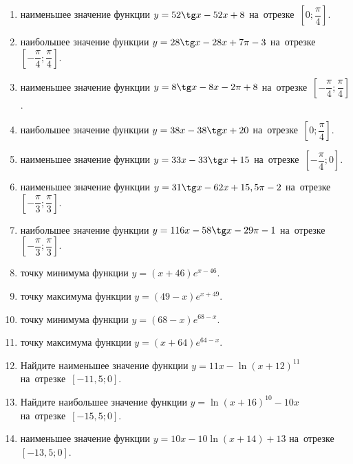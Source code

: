 \documentclass[a4paper,10pt]{article}
\begin{document}
\begin{enumerate}
\item {} наименьшее значение функции $y = 52\tg x-52x+8$ на~отрезке~$\left[0;\dfrac{\pi }{4}\right]$.

\item {} наибольшее значение функции $y=28\tg x-28x+7\pi -3$ на~отрезке~$\left[-\dfrac{\pi }{4};\dfrac{\pi }{4}\right]$.

\item {} наименьшее значение функции $y=8\tg x-8x-2\pi +8$ на~отрезке~$\left[-\dfrac{\pi }{4};\dfrac{\pi }{4}\right]$.

\item {} наибольшее значение функции $y = 38x-38\tg x +20$ на~отрезке~$\left[0;\dfrac{\pi }{4}\right]$.

\item {} наименьшее значение функции $y = 33x-33\tg x +15$ на~отрезке~$\left[-\dfrac{\pi }{4};0\right]$.

\item {} наименьшее значение функции $y = 31\tg x-62x+15,5 \pi -2$ на~отрезке~$\left[-\dfrac{\pi }{3};\dfrac{\pi }{3}\right]$.

\item {} наибольшее значение функции $y = 116x-58\tg x-29\pi -1$ на~отрезке~$\left[-\dfrac{\pi }{3};\dfrac{\pi }{3}\right]$.

\item {} точку минимума функции $y = \left(x+46\right)e^{x-46}$.

\item {} точку максимума функции $y = \left(49-x\right)e^{x+49}$.

\item {} точку минимума функции $y = \left(68-x\right)e^{68-x}$.

\item {} точку максимума функции $y = \left(x+64\right)e^{64-x}$.

\item Найдите наименьшее значение функции $y = 11x-\ln \left(x+12\right)^{11}$ на~отрезке~$\left[-11,5;0\right]$.

\item Найдите наибольшее значение функции $y = \ln \left(x+16\right)^{10}-10x$ на~отрезке~$\left[-15,5;0\right]$.

\item {} наименьшее значение функции $y = 10x-10\ln \left(x+14\right) +13$ на~отрезке~$\left[-13,5;0\right]$.


\end{enumerate}
\end{document}
